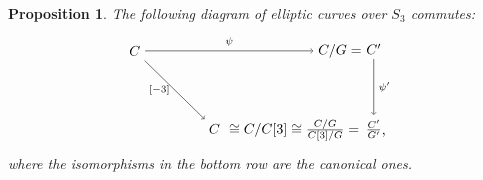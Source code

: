 \documentclass{gtpart}
\newtheorem{prop}[thm]{Proposition}
\theoremstyle{definition}
\theoremstyle{remark}
\begin{document}
\begin{prop}
\label{prop:frob^2}
 The following diagram of elliptic curves over $S_3$ commutes: 
 \begin{equation}
 \label{frob^2}
  \begin{tikzpicture}[baseline=(current bounding box.center)]
          \node (LT) at (0, 2) {$C$}; 
          \node (MT) at (5.15, 2) {$C/G = $}; 
          \node (RT) at (6, 2.05) {$C'$}; 
          \node (LB) at (2, 0.03) {$C$}; 
          \node (MB) at (4, 0) {$ \cong C/C[3] \cong \frac{C/G}{C[3]/G} = $}; 
          \node (RB) at (6, 0.025) {$\frac{C'}{G'}$}; 
          \node at (6.25, -0.125) {,}; 
          \draw [->] (LT) -- node [above] {$\scriptstyle \psi$} (MT); 
          \draw [->] (LT) -- node [left] {$\scriptstyle [-3]$} (LB); 
          \draw [->] (RT) -- node [right] {$\scriptstyle \psi'$} (RB); 
  \end{tikzpicture}
 \end{equation}
 where the isomorphisms in the bottom row are the canonical ones.  
\end{prop}
\end{document}
